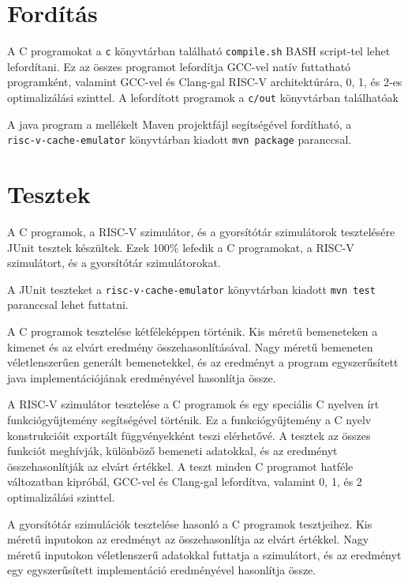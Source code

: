 \documentclass[12pt]{report}
\begin{document}
\section{Fordítás}

A C programokat a \texttt{c} könyvtárban található \texttt{compile.sh}
BASH script-tel lehet lefordítani.
Ez az összes programot lefordítja GCC-vel natív futtatható programként,
valamint GCC-vel és Clang-gal RISC-V architektúrára,
0, 1, és 2-es optimalizálási szinttel.
A lefordított programok a \texttt{c/out} könyvtárban találhatóak

A java program a mellékelt Maven projektfájl segítségével fordítható,
a \\
\texttt{risc-v-cache-emulator} könyvtárban
kiadott \texttt{mvn package} paranccsal.

\section{Tesztek}

A C programok, a RISC-V szimulátor, és a gyorsítótár szimulátorok tesztelésére
JUnit tesztek készültek.
Ezek 100\% lefedik a C programokat, a RISC-V szimulátort,
és a gyorsítótár szimulátorokat.

A JUnit teszteket a
\texttt{risc-v-cache-emulator} könyvtárban
kiadott \texttt{mvn test} paranccsal lehet futtatni.

A C programok tesztelése kétféleképpen történik.
Kis méretű bemeneteken a kimenet és az elvárt eredmény összehasonlításával.
Nagy méretű bemeneten véletlenszerűen generált bemenetekkel,
és az eredményt a program egyszerűsített java implementációjának
eredményével hasonlítja össze.

A RISC-V szimulátor tesztelése a C programok és egy speciális
C nyelven írt funkciógyűjtemény segítségével történik.
Ez a funkciógyűjtemény a C nyelv konstrukcióit
exportált függvényekként teszi elérhetővé.
A tesztek az összes funkciót meghívják, különböző bemeneti adatokkal,
és az eredményt összehasonlítják az elvárt értékkel.
A teszt minden C programot hatféle változatban kipróbál,
GCC-vel és Clang-gal lefordítva, valamint 0, 1, és 2 optimalizálási szinttel.

A gyorsítótár szimulációk tesztelése hasonló a C programok tesztjeihez.
Kis méretű inputokon az eredményt az összehasonlítja az elvárt értékkel.
Nagy méretű inputokon véletlenszerű adatokkal futtatja a szimulátort,
és az eredményt egy egyszerűsített implementáció
eredményével hasonlítja össze.
\end{document}
